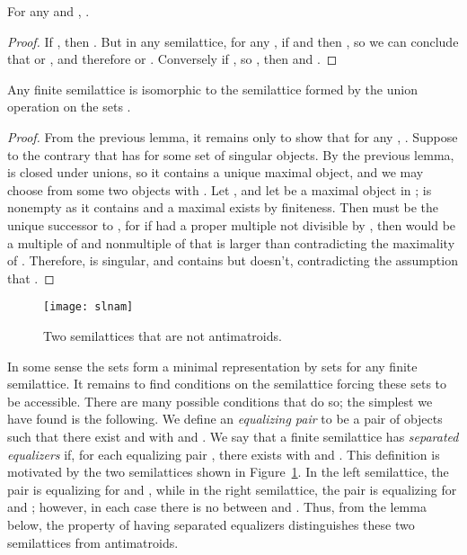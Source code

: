 \documentclass[11pt]{llncs}
\begin{document}
{\begin{lemma}
For any  and , .
\end{lemma}

\begin{proof}
If , then . But in any semilattice, for any , if  and  then , so we can conclude that  or , and therefore  or .
Conversely if , so , then  and .
\end{proof}

\begin{theorem}
\label{thm:Nsemilat}
Any finite semilattice is isomorphic to the semilattice formed by the union operation on the sets .
\end{theorem}

\begin{proof}
From the previous lemma, it remains only to show that for any , . Suppose to the contrary that  has  for some set  of singular objects. By the previous lemma,  is closed under unions, so it contains a unique maximal object, and we may choose from  some two objects  with . Let ,
and let  be a maximal object in ;  is nonempty as it contains  and a maximal  exists by finiteness. Then  must be the unique successor to , for if  had a proper multiple  not divisible by , then  would be a multiple of  and nonmultiple of  that is larger than  contradicting the maximality of . Therefore,  is singular, and  contains  but  doesn't, contradicting the assumption that .
\end{proof}

\begin{figure}[t]
\centering\texttt{[image: slnam]}
\caption{Two semilattices that are not antimatroids.}
\label{fig:slnam}
\end{figure}

In some sense the sets  form a minimal representation by sets for any finite semilattice. It remains to find conditions on the semilattice forcing these sets to be accessible. There are many possible conditions that do so; the simplest we have found is the following. We define an \emph{equalizing pair}  to be a pair of objects  such that there exist  and  with  and . We say that a finite semilattice has \emph{separated equalizers} if, for each equalizing pair , there exists  with  and . This definition is motivated by the two semilattices shown in Figure~\ref{fig:slnam}. In the left semilattice, the pair  is equalizing for  and , while in the right semilattice, the pair  is equalizing for  and ; however, in each case there is no  between  and . Thus, from the lemma below, the property of having separated equalizers distinguishes these two semilattices from antimatroids.

}
\end{document}
